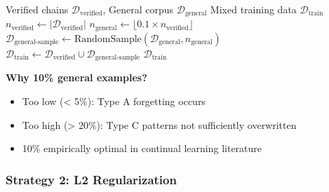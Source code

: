 \documentclass[12pt,a4paper]{article}
\theoremstyle{definition}
\begin{document}
\begin{algorithm}[htbp]
\caption{Mixed Training Data Construction}
\begin{algorithmic}[1]
\Require Verified chains $\mathcal{D}_{\text{verified}}$, General corpus $\mathcal{D}_{\text{general}}$
\Ensure Mixed training data $\mathcal{D}_{\text{train}}$
\State
\State $n_{\text{verified}} \gets |\mathcal{D}_{\text{verified}}|$
\State $n_{\text{general}} \gets \lfloor 0.1 \times n_{\text{verified}} \rfloor$ 
\State
\State $\mathcal{D}_{\text{general-sample}} \gets \text{RandomSample}(\mathcal{D}_{\text{general}}, n_{\text{general}})$
\State $\mathcal{D}_{\text{train}} \gets \mathcal{D}_{\text{verified}} \cup \mathcal{D}_{\text{general-sample}}$
\State
\State \Return $\mathcal{D}_{\text{train}}$ 
\end{algorithmic}
\end{algorithm}

\textbf{Why 10\% general examples?}
\begin{itemize}
    \item Too low (< 5\%): Type A forgetting occurs
    \item Too high (> 20\%): Type C patterns not sufficiently overwritten
    \item 10\% empirically optimal in continual learning literature
\end{itemize}

\subsubsection{Strategy 2: L2 Regularization}
\end{document}
